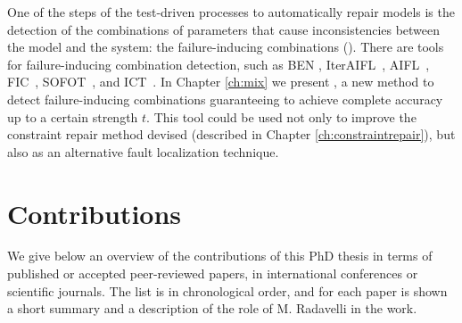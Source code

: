 One of the steps of the test-driven processes to automatically repair models is the detection of the combinations of parameters that cause inconsistencies between the model and the system: the failure-inducing combinations (\fccs).
There are tools for failure-inducing combination detection, such as BEN \cite{ben_2015,ghandehari2018combinatorial}, IterAIFL~\cite{wang_adaptive_2010}, AIFL~\cite{shi_software_nodate}, FIC~\cite{zhang_characterizing_2011}, SOFOT~\cite{nie_2011}, and ICT~\cite{Niu2018interleaving}.
In Chapter \ref{ch:mix} we present \mix, a new method to detect failure-inducing combinations guaranteeing to achieve complete accuracy up to a certain strength $t$.
This tool could be used not only to improve the constraint repair method devised (described in Chapter \ref{ch:constraintrepair}), but also as an alternative fault localization technique.
	

\section{Contributions}\label{sec:papers}

We give below an overview of the contributions of this PhD thesis in terms of published or accepted peer-reviewed papers, in international conferences or scientific journals.
The list is in chronological order, and for each paper is shown a short summary and a description of the role of M. Radavelli in the work.

